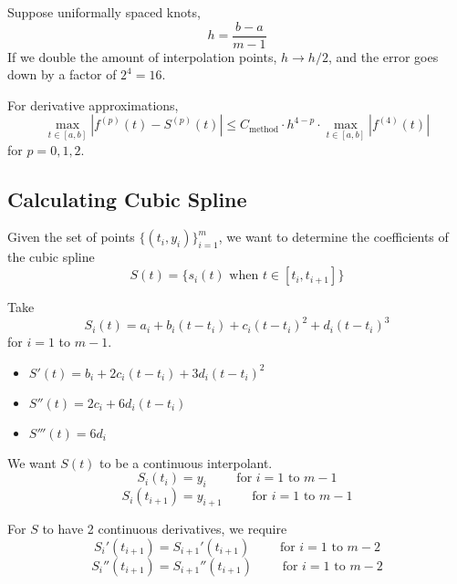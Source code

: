 Suppose uniformally spaced knots, \[
    h = \frac{b - a}{m - 1}
\] If we double the amount of interpolation points, \( h \to h/2 \), and the error goes down by a factor of \( 2^4 = 16 \).

\begin{remark}
    For derivative approximations, \[
        \max_{t \in [a,b]} | f^{(p)}(t) - S^{(p)}(t) | \leq C_{\text{method}} \cdot h^{4-p} \cdot \max_{t \in [a, b]} | f^{(4)}(t) |
    \] for \( p = 0, 1, 2 \).
\end{remark}

\subsection{Calculating Cubic Spline}

Given the set of points \( \{ (t_i, y_i) \}_{i=1}^{m} \), we want to determine the coefficients of the cubic spline \[
    S(t) = \{ s_i(t) \text{ when } t \in [t_i, t_{i+1}] \}
\]

Take \[
    S_i(t) = a_i + b_i(t - t_i) + c_i(t - t_i)^2 + d_i(t - t_i)^3
\] for \( i = 1 \) to \( m - 1 \).

\begin{itemize}
    \item \( S'(t) = b_i + 2c_i(t - t_i) + 3d_i(t - t_i)^2 \)
    \item \( S''(t) = 2c_i + 6d_i(t - t_i) \)
    \item \( S'''(t) = 6d_i \)
\end{itemize}

We want \( S(t) \) to be a continuous interpolant.
\begin{equation}\label{eq:cubic-spline-1}
    S_i(t_i) = y_i \qquad \text{ for } i = 1 \text{ to } m-1
\end{equation}\begin{equation}\label{eq:cubic-spline-2}
    S_i(t_{i+1}) = y_{i+1} \qquad \text{ for } i = 1 \text{ to } m-1
\end{equation}

For \( S \) to have 2 continuous derivatives, we require \begin{equation}\label{eq:cubic-spline-3}
    S_i'(t_{i+1}) = S_{i+1}'(t_{i+1}) \qquad \text{ for } i = 1 \text{ to } m-2
\end{equation}\begin{equation}\label{eq:cubic-spline-4}
    S_i''(t_{i+1}) = S_{i+1}''(t_{i+1}) \qquad \text{ for } i = 1 \text{ to } m-2
\end{equation}

